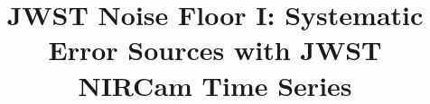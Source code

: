 \documentclass{aastex62}
\begin{document}
\title{JWST Noise Floor I: Systematic Error Sources with JWST NIRCam Time Series}


\end{document}
